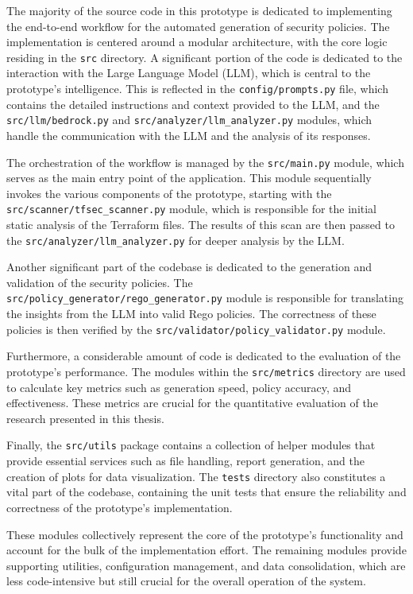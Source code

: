 The majority of the source code in this prototype is dedicated to implementing the end-to-end workflow for the automated generation of security policies. The implementation is centered around a modular architecture, with the core logic residing in the \texttt{src} directory. A significant portion of the code is dedicated to the interaction with the Large Language Model (LLM), which is central to the prototype's intelligence. This is reflected in the \texttt{config/prompts.py} file, which contains the detailed instructions and context provided to the LLM, and the \texttt{src/llm/bedrock.py} and \texttt{src/analyzer/llm\_analyzer.py} modules, which handle the communication with the LLM and the analysis of its responses.

The orchestration of the workflow is managed by the \texttt{src/main.py} module, which serves as the main entry point of the application. This module sequentially invokes the various components of the prototype, starting with the \texttt{src/scanner/tfsec\_scanner.py} module, which is responsible for the initial static analysis of the Terraform files. The results of this scan are then passed to the \texttt{src/analyzer/llm\_analyzer.py} for deeper analysis by the LLM.

Another significant part of the codebase is dedicated to the generation and validation of the security policies. The \texttt{src/policy\_generator/rego\_generator.py} module is responsible for translating the insights from the LLM into valid Rego policies. The correctness of these policies is then verified by the \texttt{src/validator/policy\_validator.py} module.

Furthermore, a considerable amount of code is dedicated to the evaluation of the prototype's performance. The modules within the \texttt{src/metrics} directory are used to calculate key metrics such as generation speed, policy accuracy, and effectiveness. These metrics are crucial for the quantitative evaluation of the research presented in this thesis.

Finally, the \texttt{src/utils} package contains a collection of helper modules that provide essential services such as file handling, report generation, and the creation of plots for data visualization. The \texttt{tests} directory also constitutes a vital part of the codebase, containing the unit tests that ensure the reliability and correctness of the prototype's implementation.

These modules collectively represent the core of the prototype's functionality and account for the bulk of the implementation effort. The remaining modules provide supporting utilities, configuration management, and data consolidation, which are less code-intensive but still crucial for the overall operation of the system.

